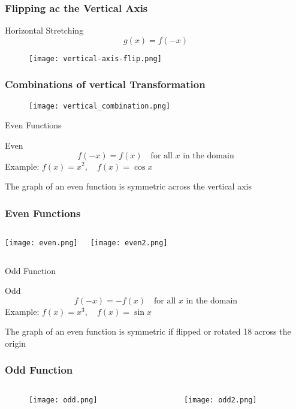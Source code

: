\begin{frame}
  \frametitle{Flipping ac the Vertical Axis}
  \begin{block}{Horizontal Stretching}
    \[g(x) = f(-x)\]
  \end{block}
  \begin{figure}[h]    
    \centering
    \texttt{[image: vertical-axis-flip.png]}
    \end{figure}
\end{frame}
\begin{frame}
  \frametitle{Combinations of vertical Transformation}
  \begin{figure}[h]    
    \centering
    \texttt{[image: vertical\_combination.png]}
    \end{figure}
\end{frame}
\begin{frame}{Even Functions}  
\begin{block}{Even}
        \[
        f(-x) = f(x) \quad \text{for all } x \text{ in the domain}
        \]
        Example: \( f(x) = x^2, \quad f(x) = \cos x \)
\end{block}
The graph of an even function is symmetric across the vertical axis 
\end{frame}
\begin{frame}
  \frametitle{Even Functions}
  \begin{columns}
    \texttt{[image: even.png]}

    \centering
    \texttt{[image: even2.png]}
\end{columns}
\end{frame}
\begin{frame}{Odd Function}
\begin{block}{Odd}
        \[
        f(-x) = -f(x) \quad \text{for all } x \text{ in the domain}
        \]
        Example: \( f(x) = x^3, \quad f(x) = \sin x \)
\end{block}
The graph of an even function is symmetric if flipped or rotated 18 across the origin 
\end{frame}

\begin{frame}
  \frametitle{Odd Function}
  \begin{columns}[T]
    \begin{column}{0.5\textwidth}
    \begin{figure}[t]
    \texttt{[image: odd.png]}
    \end{figure}
  \end{column}

  \begin{column}{0.5\textwidth}
    \begin{figure}[t]
    \texttt{[image: odd2.png]}
    \end{figure}
  \end{column}
\end{columns}
\end{frame}

